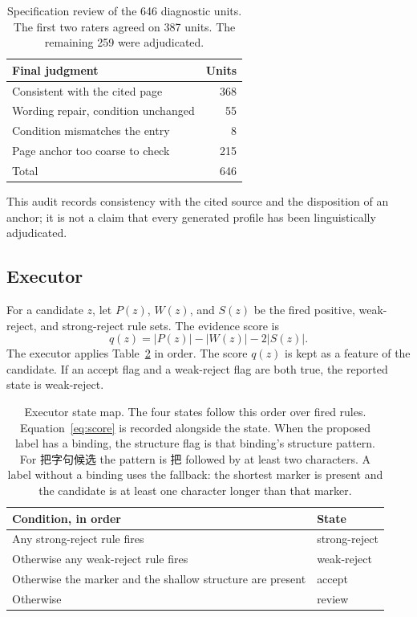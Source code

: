 \documentclass[pdflatex,sn-mathphys,NameDate]{sn-jnl}
\begin{document}
\begin{table}[!ht]
\centering
\small
\begin{tabular}{lr}
\toprule
Final judgment & Units \\
\midrule
Consistent with the cited page & 368 \\
Wording repair, condition unchanged & 55 \\
Condition mismatches the entry & 8 \\
Page anchor too coarse to check & 215 \\
\midrule
Total & 646 \\
\bottomrule
\end{tabular}
\caption{Specification review of the 646 diagnostic units. The first two raters agreed on 387 units. The remaining 259 were adjudicated.}
\label{tab:specreview}
\end{table}

This audit records consistency with the cited source and the disposition of an anchor; it is not a claim that every generated profile has been linguistically adjudicated.

\subsection{Executor}
\label{sec:executor}

For a candidate $z$, let $P(z)$, $W(z)$, and $S(z)$ be the fired positive, weak-reject, and strong-reject rule sets.
The evidence score is
\begin{equation}
q(z)=|P(z)|-|W(z)|-2|S(z)|.
\label{eq:score}
\end{equation}
The executor applies Table~\ref{tab:states} in order.
The score $q(z)$ is kept as a feature of the candidate.
If an accept flag and a weak-reject flag are both true, the reported state is weak-reject.

\begin{table}[!ht]
\centering
\small
\begin{tabular}{@{}p{}l@{}}
\toprule
Condition, in order & State \\
\midrule
Any strong-reject rule fires & strong-reject \\
Otherwise any weak-reject rule fires & weak-reject \\
Otherwise the marker and the shallow structure are present & accept \\
Otherwise & review \\
\bottomrule
\end{tabular}
\caption{Executor state map. The four states follow this order over fired rules. Equation~\ref{eq:score} is recorded alongside the state. When the proposed label has a binding, the structure flag is that binding's structure pattern. For \mbox{把字句候选} the pattern is \mbox{把} followed by at least two characters. A label without a binding uses the fallback: the shortest marker is present and the candidate is at least one character longer than that marker.}
\label{tab:states}
\end{table}
\end{document}
